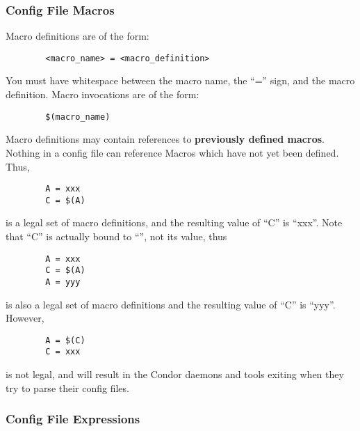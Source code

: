 \subsubsection{Config File Macros}
\label{sec:Config-File-Macros}

Macro definitions are of the form:

\begin{verbatim}
        <macro_name> = <macro_definition>
\end{verbatim}

\Note You must have whitespace between the macro name, the
``='' sign, and the macro definition.  Macro invocations are of the
form: 

\begin{verbatim}
        $(macro_name)
\end{verbatim}

Macro definitions may contain references to \textbf{previously defined
  macros}.  Nothing in a config file can reference Macros which have
  not yet been defined.  Thus,

\begin{verbatim}
        A = xxx
        C = $(A) 
\end{verbatim}

is a legal set of macro definitions, and the resulting value of ``C'' is
``xxx''.  Note that ``C'' is actually bound to ``'', not its value, thus

\begin{verbatim}
        A = xxx
        C = $(A)
        A = yyy
\end{verbatim}

is also a legal set of macro definitions and the resulting value of
``C'' is ``yyy''.  However, 

\begin{verbatim}
        A = $(C)
        C = xxx
\end{verbatim}

is not legal, and will result in the Condor daemons and tools exiting
when they try to parse their config files.

\subsubsection{Config File Expressions}
\label{sec:Config-File-Expressions}

